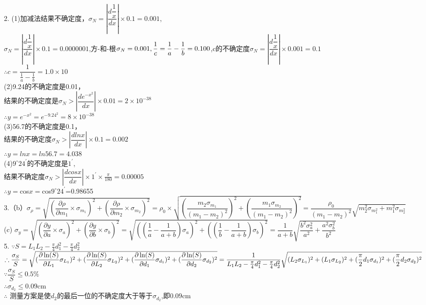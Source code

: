 \documentclass{article}
\begin{document}
2.    (1)加减法结果不确定度，$\sigma_N=|\dfrac{d\dfrac{1}{x}}{dx}|\times0.1=0.001$,\\
			$\sigma_N=|\dfrac{d\dfrac{1}{x}}{dx}|\times0.1=0.0000001$,方-和-根$\sigma_N=0.001,\\\dfrac{1}{c}=\dfrac{1}{a}-\dfrac{1}{b}=0.100$,c的不确定度$\sigma_N=|\dfrac{d\dfrac{1}{x}}{dx}|\times0.001=0.1$\\ 
			$\therefore c=\dfrac{1}{\frac{1}{a}-\frac{1}{b}}=1.0\times10$\\
\qquad    (2)9.24的不确定度是0.01，\\
结果的不确定度是$\sigma_N>|\dfrac{de^{-x^2}}{dx}|\times0.01=2\times10^{-38}$\\
			$\therefore y=e^{-x^2}=e^{-9.24^2}=8\times10^{-38}$\\
\qquad    (3)56.7的不确定度是0.1，\\
结果的不确定度$\sigma_N>|\dfrac{dlnx}{dx}|\times0.1=0.002$\\
				$\therefore y=lnx=ln56.7=4.038$\\
\qquad    (4)$9^\circ24^\prime$的不确定度是$1^\prime$,\\
结果不确定度$\sigma_N>|\dfrac{dcosx}{dx}|\times1^\prime\times\frac{\pi}{180}=0.00005$\\
$\therefore y=$cos$x=$cos$9^\circ24^\prime$=0.98655\\


3.（b）$\sigma_{\rho}=\sqrt{(\dfrac{\partial \rho}{\partial m_1}\times \sigma_{m_1})^2+(\dfrac{\partial \rho}{\partial m_2}\times\sigma_{m_2})^2}=
\rho_0\times\sqrt{(\dfrac{m_2\sigma_{m_1}}{(m_1-m_2)^2})^2+(\dfrac{m_1\sigma_{m_2}}{(m_1-m_2)^2})^2}=
\dfrac{\rho_0}{(m_1-m_2)^2}\sqrt{m_2^2\sigma_{m_1^2}+m_1^2\sigma_{m_2^2}}$\\
(c) $\sigma_{y}=\sqrt{(\dfrac{\partial y}{\partial a}\times \sigma_a)^2+(\dfrac{\partial y}{\partial b}\times\sigma_b)^2}=\sqrt{((\dfrac{1}{a}-\dfrac{1}{a+b})\sigma_a)^2+((\dfrac{1}{b}-\dfrac{1}{a+b})\sigma_b)^2}
=\dfrac{1}{a+b}\sqrt{\dfrac{b^2\sigma_{a}^2}{a^2}+\dfrac{a^2\sigma_{b}^2}{b^2}}$\\

5.
$\because S=L_1L_2 - \frac{\pi}{4}  d_{1}^{2} - \frac{\pi}{4}  d_{2}^{2}$\\
$\therefore \dfrac{\sigma_{S}}{S} = \sqrt{(\dfrac{\partial \ln(S)}{\partial L_{1}}  \sigma_{L_{1}})^{2} + (\dfrac{\partial \ln(S)}{\partial L_{2}}  \sigma_{L_{2}})^{2} + (\dfrac{\partial \ln(S)}{\partial d_{1}}  \sigma_{d_{1}})^{2} + (\dfrac{\partial \ln(S)}{\partial d_{2}}  \sigma_{d_{2}})^{2} } 
 =\\ \dfrac{1}{L_1L_2 - \frac{\pi}{4}  d_{1}^{2} - \frac{\pi}{4}  d_{2}^{2}}\sqrt{(L_{2}  \sigma_{L_{1}})^{2} + (L_{1}  \sigma_{L_{2}})^{2} + (\dfrac{\pi}{2}  d_{1} \sigma_{d_{1}})^{2} + (\dfrac{\pi}{2} d_{2}  \sigma_{d_{2}})^{2} } $\\
$\because \dfrac{\sigma_{S}}{S} \leq 0.5\%$\\
$\therefore \sigma_{d_2}\leq 0.09$cm\\
$\therefore$ 测量方案是使$d_2$的最后一位的不确定度大于等于$\sigma_{d_2}$,即$0.09$cm
\end{document}
